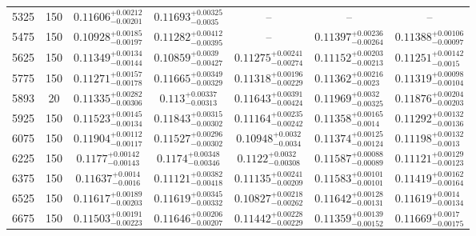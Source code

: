 \documentclass[twocolumn]{aastex63}
\begin{document}
\begin{table*}[ht!]
\begin{tabular}{ccccccc}
5325     &      150 &  $0.11606^{+0.00212}_{-0.00201}$ &   $0.11693^{+0.00325}_{-0.0035}$ &                              -- &                              -- &                              -- \\
5475     &      150 &  $0.10928^{+0.00185}_{-0.00197}$ &  $0.11282^{+0.00412}_{-0.00395}$ &                              -- &  $0.11397^{+0.00236}_{-0.00264}$ &  $0.11388^{+0.00106}_{-0.00097}$ \\
5625     &      150 &  $0.11349^{+0.00134}_{-0.00144}$ &   $0.10859^{+0.0039}_{-0.00427}$ &  $0.11275^{+0.00241}_{-0.00274}$ &  $0.11152^{+0.00203}_{-0.00213}$ &   $0.11251^{+0.00142}_{-0.0015}$ \\
5775     &      150 &  $0.11271^{+0.00157}_{-0.00178}$ &  $0.11665^{+0.00349}_{-0.00329}$ &  $0.11318^{+0.00196}_{-0.00229}$ &   $0.11362^{+0.00216}_{-0.0023}$ &  $0.11319^{+0.00098}_{-0.00104}$ \\
5893     &       20 &  $0.11335^{+0.00282}_{-0.00306}$ &    $0.113^{+0.00337}_{-0.00313}$ &  $0.11643^{+0.00391}_{-0.00424}$ &   $0.11969^{+0.0032}_{-0.00325}$ &  $0.11876^{+0.00204}_{-0.00203}$ \\
5925     &      150 &  $0.11523^{+0.00145}_{-0.00134}$ &  $0.11843^{+0.00315}_{-0.00302}$ &  $0.11164^{+0.00235}_{-0.00242}$ &   $0.11358^{+0.00165}_{-0.0014}$ &  $0.11292^{+0.00132}_{-0.00136}$ \\
6075     &      150 &  $0.11904^{+0.00112}_{-0.00117}$ &  $0.11527^{+0.00296}_{-0.00302}$ &    $0.10948^{+0.0032}_{-0.0034}$ &  $0.11374^{+0.00125}_{-0.00124}$ &   $0.11198^{+0.00132}_{-0.0013}$ \\
6225     &      150 &   $0.1177^{+0.00142}_{-0.00143}$ &   $0.1174^{+0.00348}_{-0.00346}$ &    $0.1122^{+0.0032}_{-0.00308}$ &  $0.11587^{+0.00088}_{-0.00089}$ &  $0.11121^{+0.00129}_{-0.00123}$ \\
6375     &      150 &    $0.11637^{+0.0014}_{-0.0016}$ &  $0.11121^{+0.00382}_{-0.00418}$ &  $0.11135^{+0.00241}_{-0.00209}$ &  $0.11583^{+0.00101}_{-0.00101}$ &  $0.11419^{+0.00162}_{-0.00164}$ \\
6525     &      150 &  $0.11617^{+0.00189}_{-0.00203}$ &  $0.11619^{+0.00345}_{-0.00332}$ &  $0.10827^{+0.00218}_{-0.00262}$ &  $0.11642^{+0.00128}_{-0.00131}$ &   $0.11619^{+0.0014}_{-0.00134}$ \\
6675     &      150 &  $0.11503^{+0.00191}_{-0.00223}$ &  $0.11646^{+0.00206}_{-0.00207}$ &  $0.11442^{+0.00228}_{-0.00229}$ &  $0.11359^{+0.00139}_{-0.00152}$ &   $0.11669^{+0.0017}_{-0.00175}$ \\

\end{tabular}
\end{table*}
\end{document}
